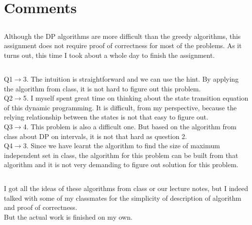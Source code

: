 \documentclass[12pt,letterpaper]{article}
\begin{document}
\section{Comments}
\subsection{}
Although the DP algorithms are more difficult than the greedy algorithms,
this assignment does not require proof of correctness for most of the problems.
As it turns out, this time I took about a whole day to finish the assignment.
\subsection{}
Q1$\to$3. The intuition is straightforward and we can use the hint.
By applying the algorithm from class,
it is not hard to figure out this problem. \\
Q2$\to$5. I myself spent great time on thinking about the state transition equation of this dynamic programming.
It is difficult, from my perspective, because the relying relationship between the states is not that easy to figure out.\\
Q3$\to$4. This problem is also a difficult one. But based on the algorithm from class about DP on intervals,
it is not that hard as question 2.\\
Q4$\to$3. Since we have learnt the algorithm to find the size of maximum independent set in class,
the algorithm for this problem can be built from that algorithm and it is not very demanding to figure out solution for this problem.
\subsection{}
I got all the ideas of these algorithms from class or our lecture notes,
but I indeed talked with some of my classmates for the simplicity of description of algorithm
and proof of correctness.\\
But the actual work is finished on my own.
\end{document}
